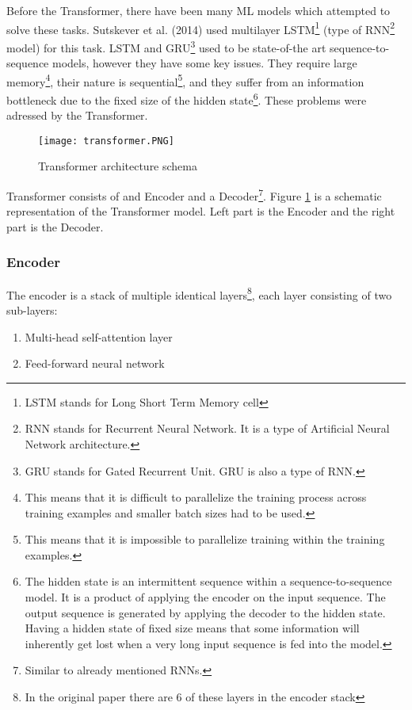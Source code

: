 Before the Transformer, there have been many ML models which attempted to solve these tasks. Sutskever et al. (2014) \cite{sutskever2014sequence} used multilayer LSTM\footnote{LSTM stands for Long Short Term Memory cell} (type of RNN\footnote{RNN stands for Recurrent Neural Network. It is a type of Artificial Neural Network architecture.} model) for this task. LSTM \cite{hochreiter1997long} and GRU\footnote{GRU stands for Gated Recurrent Unit. GRU is also a type of RNN.} \cite{cho2014learning} used to be state-of-the art sequence-to-sequence models, however they have some key issues. They require large memory\footnote{This means that it is difficult to parallelize the training process across training examples and smaller batch sizes had to be used.}, their nature is sequential\footnote{This means that it is impossible to parallelize training within the training examples.}, and they suffer from an information bottleneck due to the fixed size of the hidden state\footnote{The hidden state is an intermittent sequence within a sequence-to-sequence model. It is a product of applying the encoder on the input sequence. The output sequence is generated by applying the decoder to the hidden state. Having a hidden state of fixed size means that some information will inherently get lost when a very long input sequence is fed into the model.}. These problems were adressed by the Transformer.

\begin{figure}[h]
\centering
\texttt{[image: transformer.PNG]}
\caption{Transformer architecture schema \cite{vaswani2017attention}}
\label{fig:transformer}
\end{figure}

Transformer consists of and Encoder and a Decoder\footnote{Similar to already mentioned RNNs.}. Figure \ref{fig:transformer} is a schematic representation of the Transformer model. Left part is the Encoder and the right part is the Decoder.

\subsubsection{Encoder}

The encoder is a stack of multiple identical layers\footnote{In the original paper there are 6 of these layers in the encoder stack}, each layer consisting of two sub-layers:

\begin{enumerate}
    \item Multi-head self-attention layer
    \item Feed-forward neural network
\end{enumerate}

